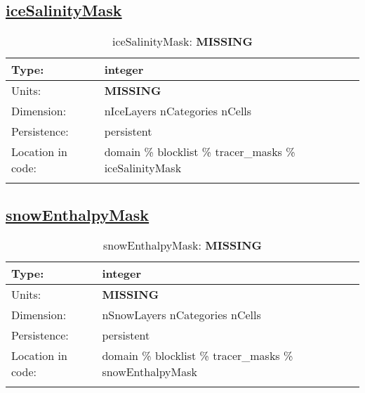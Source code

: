 \subsection[iceSalinityMask]{\hyperref[sec:var_tab_tracer_masks]{iceSalinityMask}}
\label{subsec:var_sec_tracer_masks_iceSalinityMask}
\begin{center}
\begin{longtable}{| p{2.0in} | p{4.0in} |}
        \hline 
        Type: & integer \\
        \hline 
        Units: & {\bf \color{red} MISSING} \\
        \hline 
        Dimension: & nIceLayers nCategories nCells \\
        \hline 
        Persistence: & persistent \\
        \hline 
         Location in code: & domain \% blocklist \% tracer\_masks \% iceSalinityMask \\
         \hline 
    \caption{iceSalinityMask: {\bf \color{red} MISSING}}
\end{longtable}
\end{center}
\subsection[snowEnthalpyMask]{\hyperref[sec:var_tab_tracer_masks]{snowEnthalpyMask}}
\label{subsec:var_sec_tracer_masks_snowEnthalpyMask}
\begin{center}
\begin{longtable}{| p{2.0in} | p{4.0in} |}
        \hline 
        Type: & integer \\
        \hline 
        Units: & {\bf \color{red} MISSING} \\
        \hline 
        Dimension: & nSnowLayers nCategories nCells \\
        \hline 
        Persistence: & persistent \\
        \hline 
         Location in code: & domain \% blocklist \% tracer\_masks \% snowEnthalpyMask \\
         \hline 
    \caption{snowEnthalpyMask: {\bf \color{red} MISSING}}
\end{longtable}
\end{center}
